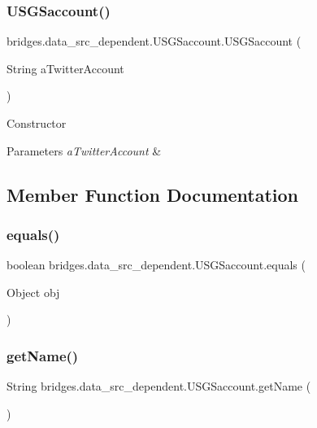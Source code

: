 \subsubsection{\texorpdfstring{USGSaccount()}{USGSaccount()}}
{\footnotesize\ttfamily bridges.\+data\+\_\+src\+\_\+dependent.\+U\+S\+G\+Saccount.\+U\+S\+G\+Saccount (\begin{DoxyParamCaption}\item[{String}]{a\+Twitter\+Account }\end{DoxyParamCaption})}

Constructor 
\begin{DoxyParams}{Parameters}
{\em a\+Twitter\+Account} & \\
\hline
\end{DoxyParams}


\subsection{Member Function Documentation}
\mbox{\label{classbridges_1_1data__src__dependent_1_1_u_s_g_saccount_a408a8361407b49199f56ace3421956bf}} 
\subsubsection{\texorpdfstring{equals()}{equals()}}
{\footnotesize\ttfamily boolean bridges.\+data\+\_\+src\+\_\+dependent.\+U\+S\+G\+Saccount.\+equals (\begin{DoxyParamCaption}\item[{Object}]{obj }\end{DoxyParamCaption})}

\mbox{\label{classbridges_1_1data__src__dependent_1_1_u_s_g_saccount_abc30e69535f158a5f7d6f6d8c8da7bec}} 
\subsubsection{\texorpdfstring{getName()}{getName()}}
{\footnotesize\ttfamily String bridges.\+data\+\_\+src\+\_\+dependent.\+U\+S\+G\+Saccount.\+get\+Name (\begin{DoxyParamCaption}{ }\end{DoxyParamCaption})}

